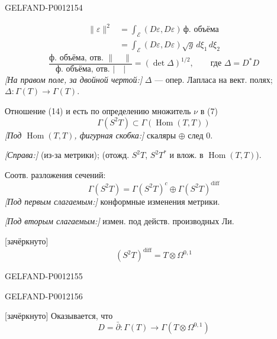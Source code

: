 \begin{GelfandAdjacentEvidence}{GELFAND-P001215}{4}

\begin{equation*}
\begin{aligned}
\|\varepsilon\|^2
&=\int_{\mathcal E}(D\varepsilon,D\varepsilon)\,\text{ф. объёма}\\
&=\int_{\mathcal E}(D\varepsilon,D\varepsilon)\sqrt g\,d\xi_1\,d\xi_2
\end{aligned}\tag{13}
\end{equation*}
\begin{equation*}
\frac{\text{ф. объёма, отв. }\|\quad\|}{\text{ф. объёма, отв. }\lvert\quad\rvert}
=(\det\Delta)^{1/2},\qquad\text{где }\Delta=D^*D\tag{14}
\end{equation*}
\textit{[На правом поле, за двойной чертой:]} \(\Delta\) --- опер. Лапласа на вект. полях;
\(\Delta:\Gamma(T)\to\Gamma(T)\).

Отношение (14) и есть по определению множитель \(\nu\) в (7)
\[
\Gamma(S^2T)\subset\Gamma(\operatorname{Hom}(T,T))
\]
\textit{[Под \(\operatorname{Hom}(T,T)\), фигурная скобка:]} скаляры \(\oplus\) след 0.

\textit{[Справа:]} (из-за метрики); (отожд. \(S^2T\), \(S^2T^*\) и влож. в \(\operatorname{Hom}(T,T)\)).

Соотв. разложения сечений:
\begin{equation*}
\Gamma(S^2T)=\Gamma(S^2T)^c\oplus\Gamma(S^2T)^{\mathrm{diff}}\tag{15}
\end{equation*}
\textit{[Под первым слагаемым:]} конформные изменения метрики.

\textit{[Под вторым слагаемым:]} измен. под действ. производных Ли.

[зачёркнуто]
\begin{equation*}
(S^2T)^{\mathrm{diff}}=T\otimes\Omega^{0,1}\tag{16}
\end{equation*}
\end{GelfandAdjacentEvidence}
\begin{GelfandAdjacentEvidence}{GELFAND-P001215}{5}

\end{GelfandAdjacentEvidence}
\begin{GelfandAdjacentEvidence}{GELFAND-P001215}{6}


[зачёркнуто] Оказывается, что
\begin{equation*}
D=\bar\partial:\Gamma(T)\longrightarrow\Gamma(T\otimes\Omega^{0,1})\tag{17}
\end{equation*}
\end{GelfandAdjacentEvidence}


